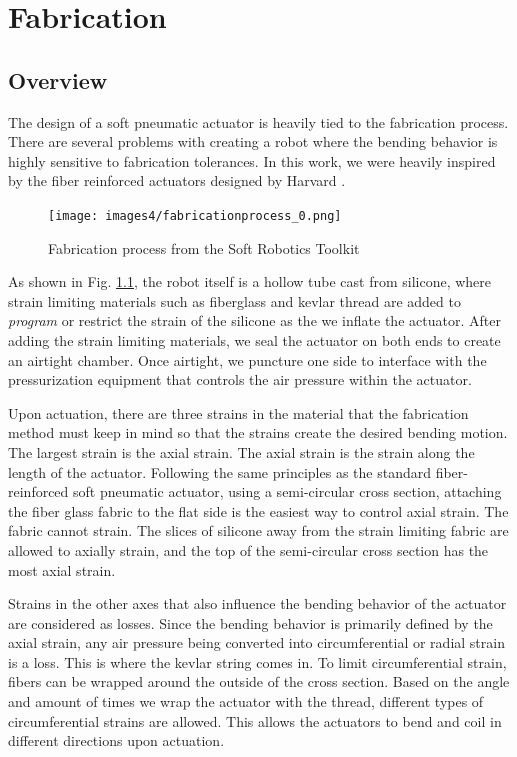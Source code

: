 \chapter{Fabrication}

\section{Overview}
The design of a soft pneumatic actuator is heavily tied to the fabrication process. There are several problems with creating a robot where the bending behavior is highly sensitive to fabrication tolerances. In this work, we were heavily inspired by the fiber reinforced actuators designed by Harvard \cite{galloway_mechanically_2013}. 

\begin{figure}[h]
    \centering
    \texttt{[image: images4/fabricationprocess\_0.png]}
    \caption{Fabrication process from the Soft Robotics Toolkit}
    \label{fig:toolkitfab}
\end{figure}

As shown in Fig. \ref{fig:toolkitfab}, the robot itself is a hollow tube cast from silicone, where strain limiting materials such as fiberglass and kevlar thread are added to \emph{program} or restrict the strain of the silicone as the we inflate the actuator. After adding the strain limiting materials, we seal the actuator on both ends to create an airtight chamber. Once airtight, we puncture one side to interface with the pressurization equipment that controls the air pressure within the actuator. 

Upon actuation, there are three strains in the material that the fabrication method must keep in mind so that the strains create the desired bending motion. The largest strain is the axial strain. The axial strain is the strain along the length of the actuator. Following the same principles as the standard fiber-reinforced soft pneumatic actuator, using a semi-circular cross section, attaching the fiber glass fabric to the flat side is the easiest way to control axial strain. The fabric cannot strain. The slices of silicone away from the strain limiting fabric are allowed to axially strain, and the top of the semi-circular cross section has the most axial strain. 

Strains in the other axes that also influence the bending behavior of the actuator are considered as losses. Since the bending behavior is primarily defined by the axial strain, any air pressure being converted into circumferential or radial strain is a loss. This is where the kevlar string comes in. To limit circumferential strain, fibers can be wrapped around the outside of the cross section. Based on the angle and amount of times we wrap the actuator with the thread, different types of circumferential strains are allowed. This allows the actuators to bend and coil in different directions upon actuation. 

